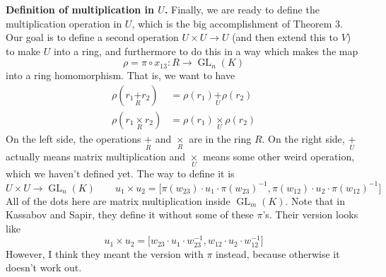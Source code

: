 \documentclass[12pt]{article}
\theoremstyle{definition}
\numberwithin{theorem}{subsection}
\newcommand{\lp}{\left(}
\newcommand{\rp}{\right)}
\newcommand{\tbf}{\textbf}
\newcommand{\noi}{\noindent}
\newcommand{\inv}{^{-1}}
\DeclareMathOperator{\GL}{GL}
\begin{document}
\noi \tbf{Definition of multiplication in $U$.} Finally, we are ready to define the multiplication operation in $U$, which is the big accomplishment of Theorem 3. Our goal is to define a second operation $U \times U \to U$ (and then extend this to $V$) to make $U$ into a ring, and furthermore to do this in a way which makes the map
\[
	\rho = \pi \circ x_{13}:R \to \GL_n(K)
\]
into a ring homomorphism. That is, we want to have
\begin{align*}
	\rho \lp  r_1 \underset{R}{+} r_2 \rp &= \rho(r_1) \underset{U}{+} \rho(r_2) \\
	 \rho \lp r_1 \underset{R}{\times} r_2 \rp &= \rho(r_1) \underset{U}{\times} \rho(r_2)
\end{align*}
On the left side, the operations $\underset{R}{+}$ and $\underset{R}{\times}$ are in the ring $R$. On the right side, $\underset{U}{+}$ actually means matrix multiplication and $\underset{U}{\times}$ means some other weird operation, which we haven't defined yet. The way to define it is
\[
	U \times U \to \GL_n(K) \qquad u_1 \times u_2 = \Big[ \pi(w_{23}) \cdot u_1 \cdot \pi(w_{23}) \inv, \pi(w_{12}) \cdot u_2 \cdot \pi(w_{12}) \inv \Big]
\]
All of the dots here are matrix multiplication inside $\GL_m(K)$. Note that in Kassabov and Sapir, they define it without some of these $\pi$'s. Their version looks like
\[
	u_1 \times u_2 = \Big[ w_{23} \cdot u_1 \cdot w_{23} \inv, w_{12} \cdot u_2 \cdot w_{12} \inv \Big]
\]
However, I think they meant the version with $\pi$ instead, because otherwise it doesn't work out. 
\end{document}

